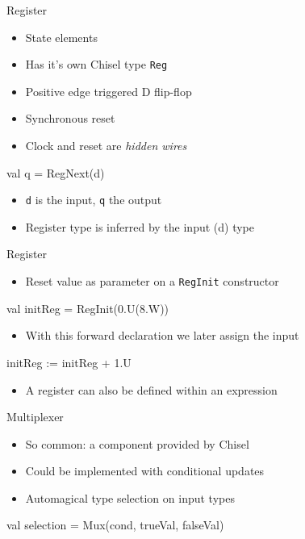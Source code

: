 \documentclass[xcolor=pdflatex,dvipsnames,table]{beamer}
\newcommand{\code}[1]{{\texttt{#1}}}
\begin{document}
\begin{frame}[fragile]{Register}
\begin{itemize}
\item State elements
\item Has it's own Chisel type \code{Reg}
\item Positive edge triggered D flip-flop
\item Synchronous reset
\item Clock and reset are \emph{hidden wires}
\end{itemize}
\begin{chisel}
val q = RegNext(d)
\end{chisel}
\begin{itemize}
\item \code{d} is the input, \code{q} the output
\item Register type is inferred by the input (d) type
\end{itemize}
\end{frame}

\begin{frame}[fragile]{Register}
\begin{itemize}
\item Reset value as parameter on a \code{RegInit} constructor
\end{itemize}
\begin{chisel}
val initReg = RegInit(0.U(8.W))
\end{chisel}
\begin{itemize}
\item With this forward declaration we later assign the input
\end{itemize}
\begin{chisel}
initReg := initReg + 1.U
\end{chisel}
\begin{itemize}
\item A register can also be defined within an expression
\end{itemize}

\end{frame}

\begin{frame}[fragile]{Multiplexer}
\begin{itemize}
\item So common: a component provided by Chisel
\item Could be implemented with conditional updates
\item Automagical type selection on input types
\end{itemize}
\begin{chisel}
val selection = Mux(cond, trueVal, falseVal)
\end{chisel}
\end{frame}
\end{document}
